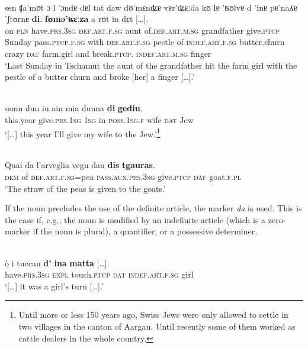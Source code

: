 \ea\label{}
\\
\gll sen ʧa'mʊt ɔ l 'ɔndɐ dɐl tat daw dʊ'mɛnʥɐ vɐr'ʥɛːda kʊ lɐ 'ʦʊlvɐ d 'inɐ pɐ'naʎɐ 'ʃtʊrnɐ \textbf{diː} \textbf{fʊmǝ'ʨɛːza} a rʊt in dɛt […].\\
     on \textsc{pln} have.\textsc{prs.3sg} \textsc{def.art.f.sg} aunt of.\textsc{def.art.m.sg} grandfather give.\textsc{ptcp} Sunday pass.\textsc{ptcp.f.sg} with \textsc{def.art.f.sg} pestle of  \textsc{indef.art.f.sg} butter.churn crazy \textsc{dat} farm.girl and break.\textsc{ptcp.} \textsc{indef.art.m.sg} finger\\
\glt `Last Sunday in Tschamut the aunt of the grandfather hit the farm girl with the pestle of a butter churn and broke [her] a finger […].'
\z


\ea\label{}
\\
\gll […] uonn dun iu ain mia dunna \textbf{di} \textbf{gediu}.\\
     […] this.year give.\textsc{prs.1sg} \textsc{1sg} in \textsc{poss.1sg.f} wife \textsc{dat} Jew \\
\glt `[…] this year I’ll give my wife to the Jew.'\footnote{Until more or less 150 years ago, Swiss Jews were only allowed to settle in two villages in the canton of Aargau. Until recently some of them worked as cattle dealers in the whole country.}
\z

\ea\label{}
\\
\gll Quai da l’arveglia vegn dau \textbf{dis} \textbf{tgauras}.  \\
     \textsc{dem} of  \textsc{def.art.f.sg}=pea \textsc{pass.aux.prs.3sg} give.\textsc{ptcp} \textsc{daf} goat.\textsc{f.pl} \\
\glt `The straw of the peas is given to the goats.'
\z


If the noun precludes the use of the definite article, the marker \textit{da} is used. This is the case if, e.g., the noun is modified by an indefinite article (which is a zero-marker if the noun is plural), a quantifier, or a possessive determiner.

\ea\label{}
\\
\gll […] ò i tuccau \textbf{d'} \textbf{ina} \textbf{matta} […].\\
      […] have.\textsc{prs.3sg} \textsc{expl} touch.\textsc{ptcp} \textsc{dat} \textsc{indef.art.f.sg} girl \\
\glt `[…] it was a girl's turn […].'
\z

